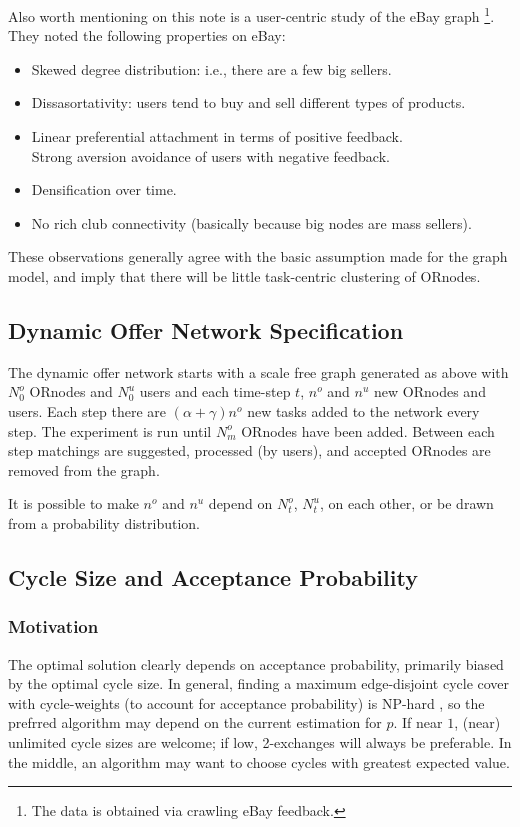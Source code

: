 \documentclass[main.tex]{subfiles}
\begin{document}
Also worth mentioning on this note is a user-centric study of the eBay graph \cite{ebay}\footnote{The data is obtained via crawling eBay feedback.}. They noted the following properties on eBay:

\begin{itemize}
  \item Skewed degree distribution: i.e., there are a few big sellers.
  \item Dissasortativity: users tend to buy and sell different types of products.
  \item Linear preferential attachment in terms of positive feedback.
     \\ Strong aversion avoidance of users with negative feedback.
  \item Densification over time.
  \item No rich club connectivity (basically because big nodes are mass sellers).
\end{itemize}

These observations generally agree with the basic assumption made for the graph model, and imply that there will be little task-centric clustering of ORnodes.


\subsection{Dynamic Offer Network Specification}
The dynamic offer network starts with a scale free graph generated as above with $N^o_0$ ORnodes and $N^u_0$ users and each time-step $t$, $n^o$ and $n^u$ new ORnodes and users. Each step there are $(\alpha + \gamma) n^o$ new tasks added to the network every step. The experiment is run until $N^o_m$ ORnodes have been added. Between each step matchings are suggested, processed (by users), and accepted ORnodes are removed from the graph.

It is possible to make $n^o$ and $n^u$ depend on $N^o_t$, $N^u_t$, on each other, or be drawn from a probability distribution.

\subsection{Cycle Size and Acceptance Probability}

\subsubsection{Motivation}
The optimal solution clearly depends on acceptance probability, primarily biased by the optimal cycle size. In general, finding a maximum edge-disjoint cycle cover with cycle-weights (to account for acceptance probability) is NP-hard \cite{Bir}, so the prefrred algorithm may depend on the current estimation for $p$. If near $1$, (near) unlimited cycle sizes are welcome; if low, 2-exchanges will always be preferable.  In the middle, an algorithm may want to choose cycles with greatest expected value.
\end{document}
